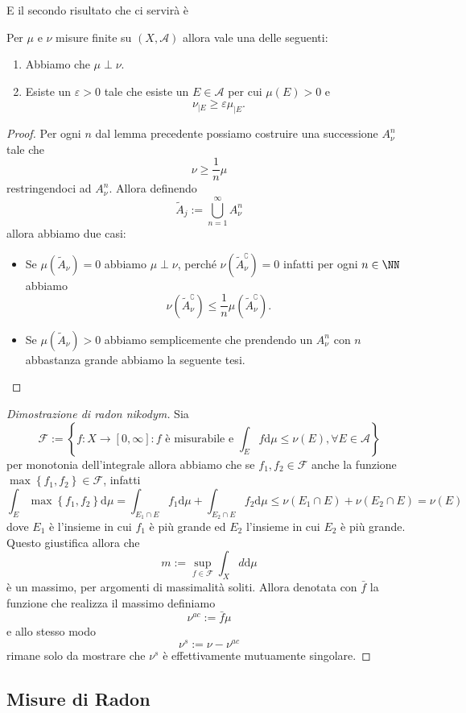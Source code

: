 \documentclass[11pt]{scrartcl}
\newcommand{\dif}{\text{d}}
\begin{document}
	E il secondo risultato che ci servirà è
	\begin{lemma}
		Per $\mu$ e $\nu$ misure finite su $(X,\mathcal{A})$ allora vale una delle seguenti:
		\begin{enumerate}
			\item Abbiamo che $\mu \perp \nu$.
			\item Esiste un $\varepsilon>0$ tale che esiste un $E\in \mathcal{A}$ per cui $\mu(E)>0$ e 
			$$\nu_{\mid E}\ge \varepsilon \mu_{\mid E}.$$
		\end{enumerate}
	\end{lemma}
	\begin{proof}
		Per ogni $n$ dal lemma precedente possiamo costruire una successione $A^n_\nu$ tale che 
		$$\nu \ge \frac{1}{n}\mu$$
		restringendoci ad $A^n_\nu$. Allora definendo
		$$\tilde{A}_j:=\bigcup_{n=1}^\infty A^n_\nu$$
		allora abbiamo due casi:
		\begin{itemize}
			\item Se $\mu(\tilde{A}_\nu)=0$ abbiamo $\mu\perp\nu$, perché $\nu(\tilde{A}_\nu^\complement)=0$ infatti per ogni $n\in\NN$ abbiamo
			$$\nu(\tilde{A}^\complement_\nu)\le \frac{1}{n}\mu(\tilde{A}^\complement_\nu).$$
			\item Se $\mu(\tilde{A}_\nu)>0$ abbiamo semplicemente che prendendo un $A^n_\nu$ con $n$ abbastanza grande abbiamo la seguente tesi.
		\end{itemize}
	\end{proof}
	\begin{proof}[Dimostrazione di radon nikodym]
		Sia
		$$\mathcal{F}:=\left\{f:X\to [0,\infty]:\text{$f$ è misurabile e }\int_Ef\dif \mu \le \nu(E),\forall E \in \mathcal{A}\right\}$$
		per monotonia dell'integrale allora abbiamo che se $f_1,f_2\in \mathcal{F}$ anche la funzione $\max\left\{f_1,f_2\right\}\in\mathcal{F}$, infatti 
		$$\int_E\max\left\{f_1,f_2\right\}\dif \mu = \int_{E_1\cap E} f_1\dif\mu +\int_{E_2\cap E} f_2\dif \mu \le \nu(E_1\cap E)+\nu(E_2\cap E)=\nu(E)$$
		dove $E_1$ è l'insieme in cui $f_1$ è più grande ed $E_2$ l'insieme in cui $E_2$ è più grande. Questo giustifica allora che 
		$$m:=\sup_{f\in\mathcal{F}}\int_X d\dif \mu$$
		è un massimo, per argomenti di massimalità soliti. Allora denotata con $\bar{f}$ la funzione che realizza il massimo definiamo
		$$\nu^{ac}:=\bar{f}\mu$$
		e allo stesso modo
		$$\nu^s:=\nu-\nu^{ac}$$
		rimane solo da mostrare che $\nu^s$ è effettivamente mutuamente singolare.
	\end{proof}
	
	\subsection{Misure di Radon}
	
\end{document}
